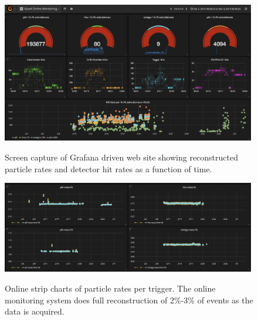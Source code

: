 \begin{figure}[tbp]
\begin{center}
\includegraphics[width=0.99\textwidth]{figures/online_monitoring_grafana1.png}
\label{fig:online_monitoring_grafana1}
\caption{Screen capture of Grafana driven web site showing reconstructed particle rates and detector hit rates as a function of time.}
\end{center}  
\end{figure}

\begin{figure}[tbp]
\begin{center}
\includegraphics[width=0.99\textwidth]{figures/online_monitoring_grafana2.png}
\label{fig:online_monitoring_grafana2}
\caption{Online strip charts of particle rates per trigger. The online monitoring system does full reconstruction of 2\%-3\% of events as the data is acquired.}   
\end{center}  
\end{figure}

